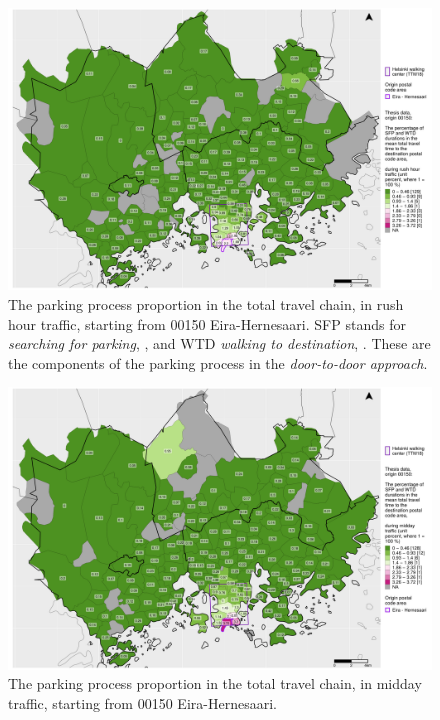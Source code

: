\begin{figure}
    \centering
    \includegraphics[trim={0.9cm 0.3cm 0.25cm 0.3cm},clip,width=\textwidth]{images/compare_traveltimes_mapfill-msc_r_pct_fromzip-00150_28-09-2020.png}
    \caption[Parking process proportion from Eira-Hernesaari, rush hour traffic]{The parking process proportion in the total travel chain, in rush hour traffic, starting from 00150 Eira-Hernesaari. SFP stands for \textit{searching for parking}, , and WTD \textit{walking to destination}, . These are the components of the parking process in the \textit{door-to-door approach}.}%
    \label{fig:compare_msc_r_pct_00150}%
\end{figure}

\begin{figure}
    \centering
    \includegraphics[trim={0.9cm 0.3cm 0.25cm 0.3cm},clip,width=\textwidth]{images/compare_traveltimes_mapfill-msc_m_pct_fromzip-00150_28-09-2020.png}
    \caption[Parking process proportion from Eira-Hernesaari, midday traffic]{The parking process proportion in the total travel chain, in midday traffic, starting from 00150 Eira-Hernesaari.}%
    \label{fig:compare_msc_m_pct_00150}%
\end{figure}

